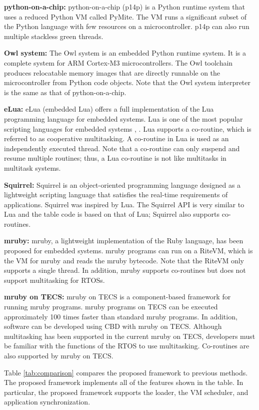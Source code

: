 \documentclass[S,R,E]{article/compsoft}
\begin{document}
{\bf python-on-a-chip:} python-on-a-chip (p14p) is a Python runtime system that uses a reduced Python VM called PyMite.
The VM runs a significant subset of the Python language with few resources on a microcontroller.
p14p can also run multiple stackless green threads.

{\bf Owl system:} The Owl system is an embedded Python runtime system.
It is a complete system for ARM Cortex-M3 microcontrollers.
The Owl toolchain produces relocatable memory images that are directly runnable on the microcontroller from Python code objects.
Note that the Owl system interpreter is the same as that of python-on-a-chip.

{\bf eLua:} eLua (embedded Lua) offers a full implementation of the Lua programming language for embedded systems.
Lua is one of the most popular scripting languages for embedded systems \cite{url:Lua}, \cite{par:Lua}.
Lua supports a co-routine, which is referred to as cooperative multitasking.
A co-routine in Lua is used as an independently executed thread.
Note that a co-routine can only suspend and resume multiple routines; thus, a Lua co-routine is not like multitasks in multitask systems.

{\bf Squirrel:} Squirrel is an object-oriented programming language designed as a lightweight scripting language that satisfies the real-time requirements of applications.
Squirrel was inspired by Lua.
The Squirrel API is very similar to Lua and the table code is based on that of Lua; Squirrel also supports co-routines.

{\bf mruby:} mruby, a lightweight implementation of the Ruby language, has been proposed for embedded systems.
mruby programs can run on a RiteVM, which is the VM for mruby and reads the mruby bytecode.
Note that the RiteVM only supports a single thread.
In addition, mruby supports co-routines but does not support multitasking for RTOSs.

{\bf mruby on TECS:} mruby on TECS is a component-based framework for running mruby programs.
mruby programs on TECS can be executed approximately 100 times faster than standard mruby programs.
In addition, software can be developed using CBD with mruby on TECS.
Although multitasking has been supported in the current mruby on TECS, developers must be familiar with the functions of the RTOS to use multitasking.
Co-routines are also supported by mruby on TECS.

Table \ref{tab:comparison} compares the proposed framework to previous methods.
The proposed framework implements all of the features shown in the table.
In particular, the proposed framework supports the loader, the VM scheduler, and application synchronization.
\end{document}
